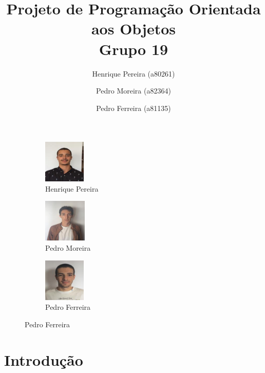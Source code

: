 \documentclass[a4paper]{article}
\title{Projeto de Programação Orientada aos Objetos\\Grupo 19}
\author{Henrique Pereira (a80261) \and Pedro Moreira (a82364) \and Pedro Ferreira (a81135) }
\begin{document}
\maketitle

\begin{figure}
\centering
\begin{subfigure}{.4\textwidth}
  \centering
  \includegraphics[width=.3\linewidth]{henrique.png}
  \caption{Henrique Pereira}
\end{subfigure}
\begin{subfigure}{.4\textwidth}
  \centering
  \includegraphics[width=.3\linewidth]{pedro.png}
  \caption{Pedro Moreira}
\end{subfigure}
\begin{subfigure}{.4\textwidth}
  \centering
  \includegraphics[width=.3\linewidth]{ferreira.png}
  \caption{Pedro Ferreira}
\end{subfigure}
\end{figure}



\newpage

\tableofcontents

\newpage

\section{Introdução}
\label{sec:intro}
\end{document}
